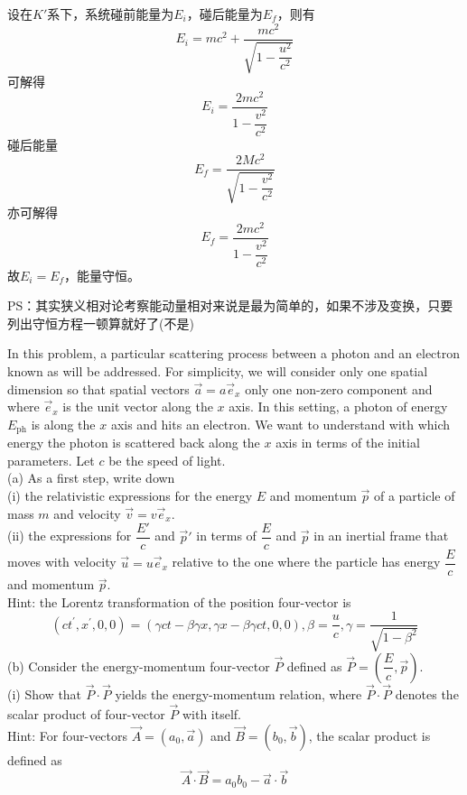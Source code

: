 \begin{solution}
    设在$K'$系下，系统碰前能量为$E_i$，碰后能量为$E_f$，则有
    \[E_i=mc^{2}+\frac{mc^{2}}{\sqrt{1-\dfrac{u^{2}}{c^{2}}}}\]
    可解得
    \[E_i=\frac{2mc^{2}}{1-\dfrac{v^2}{c^2}}\]
    碰后能量
    \[E_f=\frac{2Mc^{2}}{\sqrt{1-\dfrac{v^{2}}{c^{2}}}}\]
    亦可解得
    \[E_f=\frac{2mc^{2}}{1-\dfrac{v^2}{c^2}}\]
    故$E_i=E_f$，能量守恒。

    PS：其实狭义相对论考察能动量相对来说是最为简单的，如果不涉及变换，只要列出守恒方程一顿算就好了(不是)
\end{solution}

\begin{solution}
    In this problem, a particular scattering process between a photon and an electron known as  will be addressed. For simplicity, we will consider only one spatial dimension so that spatial vectors $\vec{a}=a\vec{e}_x$   only one non-zero component and where $\vec{e}_x$ is the unit vector along the $x$ axis. In this setting, a photon of energy $E_\mathrm{ph}$ is  along the $x$ axis and hits an electron. We want to understand with which energy the photon is scattered back along the $x$ axis in terms of the initial parameters. Let $c$ be the speed of light.
    \\(a) As a first step, write down
    \\\hspace*{2em}(i) the relativistic expressions for the energy $E$ and momentum $\vec{p}$ of a particle of mass $m$ and velocity $\vec{v} = v\vec{e}_x$.
    \\\hspace*{2em}(ii) the expressions for $\dfrac{E'}{c}$ and $\vec{p}'$ in terms of $\dfrac{E}{c}$ and $\vec{p}$ in an inertial frame that moves with
    velocity $\vec{u}=u\vec{e}_{x}$ relative to the one where the particle has energy $\dfrac{E}{c}$ and momentum $\vec{p}$.\\
    Hint: the Lorentz transformation of the position four-vector is \[(ct^{\prime},x^{\prime},0,0)=(\gamma ct-\beta\gamma x,\gamma x-\beta \gamma ct, 0, 0), \beta = \dfrac{u}{c}, \gamma = \dfrac{1}{\sqrt {1- \beta ^2}}\]
    (b) Consider the energy-momentum four-vector $\vec{P}$ defined as $\vec{P}=(\dfrac{E}{c},\vec{p})$.\\
    \hspace*{2em}(i) Show that $\vec{P}\cdot\vec{P}$ yields the energy-momentum relation, where $\vec{P}\cdot\vec{P}$ denotes the scalar product of four-vector $\vec{P}$ with itself.\\ Hint: For four-vectors $\vec{A}=(a_0,\vec{a})$ and $\vec{B}=(b_0,\vec{b})$, the scalar product is defined as  \[\vec{A}\cdot\vec{B}=a_{0}b_{0}-\vec{a}\cdot\vec{b}\]

\end{solution}
